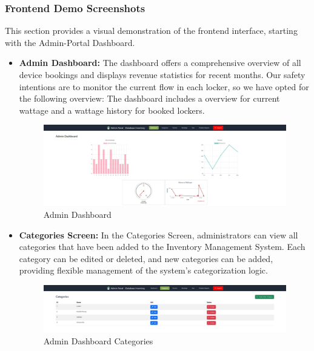 \subsubsection{Frontend Demo Screenshots}
This section provides a visual demonstration of the frontend interface, starting with the Admin-Portal Dashboard. 
\begin{itemize}
\item \textbf {Admin Dashboard: } The dashboard offers a comprehensive overview of all device bookings and displays revenue statistics for recent months. Our safety intentions are to monitor the current flow in each locker, so we have opted for the following overview: The dashboard includes a overview for current wattage and a wattage history for booked lockers.
\begin{figure}[h]
    \centering
    \includegraphics[width=1\linewidth]{images/admin-dashboard.JPG}
    \caption{Admin Dashboard}
    \label{fig:admin-dashboard}
\end{figure}

\item \textbf {Categories Screen: }In the Categories Screen, administrators can view all categories that have been added to the Inventory Management System. Each category can be edited or deleted, and new categories can be added, providing flexible management of the system's categorization logic.
\begin{figure}[h]
    \centering
    \includegraphics[width=1\linewidth]{images/categories.JPG}
    \caption{Admin Dashboard Categories}
    \label{fig:categories-dashboard}
\end{figure}



\end{itemize}
